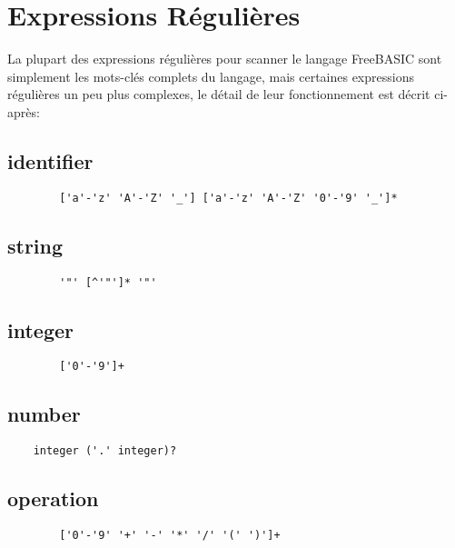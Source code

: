 \section{Expressions Régulières}

La plupart des expressions régulières pour scanner le langage FreeBASIC sont simplement les mots-clés complets du langage, mais certaines expressions régulières un peu plus complexes, le détail de leur fonctionnement est décrit ci-après:

\subsection{identifier} 
    \begin{verbatim}
        ['a'-'z' 'A'-'Z' '_'] ['a'-'z' 'A'-'Z' '0'-'9' '_']*
    \end{verbatim}
    
\subsection{string } 
    \begin{verbatim}
        '"' [^'"']* '"'
    \end{verbatim}
    
\subsection{integer } 
    \begin{verbatim}
        ['0'-'9']+
    \end{verbatim}
    
\subsection{number }
\begin{verbatim}
    integer ('.' integer)?
\end{verbatim}

\subsection{operation  }
    \begin{verbatim}
        ['0'-'9' '+' '-' '*' '/' '(' ')']+
    \end{verbatim}